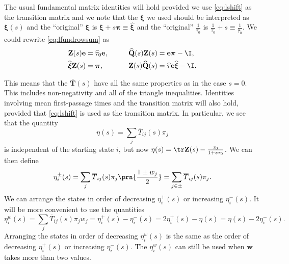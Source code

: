 \documentclass[12pt]{article}
\newcommand{\onev}{\mathbf{e}}
\newcommand{\MMm}{Q}
\newcommand{\MM}{\mathbf{\MMm}}
\newcommand{\eqm}{\pi}
\newcommand{\eq}{\boldsymbol{\eqm}}
\newcommand{\fptm}{T}
\newcommand{\fpt}{\mathbf{\fptm}}
\newcommand{\fptbm}{\overline{\fptm}}
\newcommand{\fptb}{\overline{\fpt}}
\newcommand{\fundm}{Z}
\newcommand{\fund}{\mathbf{\fundm}}
\newcommand{\arowm}{\xi}
\newcommand{\arow}{\boldsymbol{\arowm}}
\newcommand{\etwm}{\eta^w}
\newcommand{\wm}{w}
\newcommand{\w}{\mathbf{\wm}}
\newcommand{\shift}[1]{\widehat{#1}}
\begin{document}
The usual fundamental matrix identities will hold provided we use \cref{eq:lshift} as the transition matrix and we note that the \( \arow \) we used should be interpreted as \( \arow(s)\) and the ``original'' \( \arow \) is \( \arow + s \eq \equiv \shift{\arow}\) and the ``original'' \( \frac{1}{\tau_0} \) is \( \frac{1}{\tau_0} + s \equiv \frac{1}{\shift{\tau}_0}\).
We could rewrite \cref{eq:lfundrowsum} as
%
\begin{equation}\label{eq:lshiftrowsum}
\begin{aligned}
  \fund(s) \onev &= {\shift{\tau}_0}\onev, \qquad &
  \shift{\MM}(s) \fund(s) &= \onev \eq - \I, \\ 
  \shift{\arow} \fund(s) &= \eq,  &
  \fund(s) \shift{\MM}(s) &= \shift{\tau} \onev \shift{\arow} - \I.
\end{aligned}
\end{equation}
%

This means that the \( \fptb(s) \) have all the same properties as in the case \(s=0\).
This includes non-negativity and all of the triangle inequalities.
Identities involving mean first-passage times and the transition matrix will also hold, provided that \cref{eq:lshift} is used as the transition matrix.
In particular, we see that the quantity
%
\begin{equation}\label{eq:lkemeny}
  \eta(s) = \sum_j \fptbm_{ij}(s) \eqm_j
\end{equation}
%
is independent of the starting state \(i\), but now \(\eta(s) = \tr\fund(s) - \frac{\tau_0}{1 + s \tau_0}\).
We can then define
%
\begin{equation}\label{eq:lpmixtime}
  \eta^{\pm}_i(s) = \sum_j \fptbm_{ij}(s) \eqm_j \prn{\frac{1 \pm \wm_j}{2}} 
      =  \sum_{j\in \pm} \fptbm_{ij}(s) \eqm_j.
\end{equation}
%
We can arrange the states in order of decreasing \(\eta^{+}_i(s)\) or increasing \(\eta^{-}_i(s)\).
It will be more convenient to use the quantities
%
\begin{equation}\label{eq:lwpmixtime}
  \etwm_i(s) = \sum_j \fptbm_{ij}(s)\eqm_j \wm_j
    = \eta^+_i(s) - \eta^-_i(s) 
    = 2\eta^+_i(s) - \eta(s) 
    = \eta(s) - 2\eta^-_i(s) .
\end{equation}
%
Arranging the states in order of decreasing \(\etwm_i(s)\) is the same as the order of decreasing \(\eta^{+}_i(s)\) or increasing \(\eta^{-}_i(s)\).
The \(\etwm_i(s)\) can still be used when \(\w\) takes more than two values.

\end{document}
